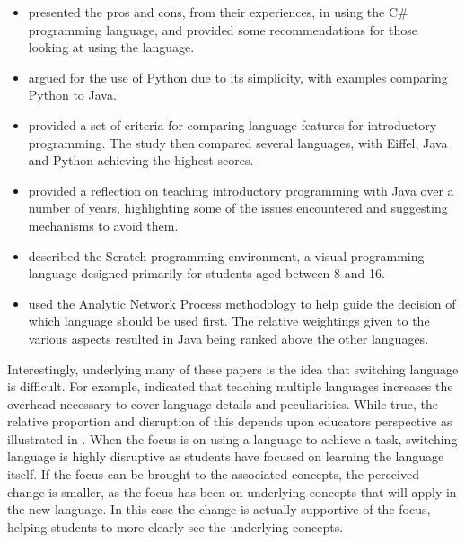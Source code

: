 \begin{itemize}[noitemsep,nolistsep]
	\item \citet{Bishop:2006} presented the pros and cons, from their experiences, in using the C\# programming language, and provided some recommendations for those looking at using the language.

	\item \citet{Mannila:2006} argued for the use of Python due to its simplicity, with examples comparing Python to Java.

	\item \citet{Mannila:2006a} provided a set of criteria for comparing language features for introductory programming. The study then compared several languages, with Eiffel, Java and Python achieving the highest scores.

	\item \citet{Pendergast:2006} provided a reflection on teaching introductory programming with Java over a number of years, highlighting some of the issues encountered and suggesting mechanisms to avoid them.

	\item \citet{Maloney:2010} described the Scratch programming environment, a visual programming language designed primarily for students aged between 8 and 16.

	\item \citet{Anik:2011} used the Analytic Network Process methodology to help guide the decision of which language should be used first. The relative weightings given to the various aspects resulted in Java being ranked above the other languages.
\end{itemize}

Interestingly, underlying many of these papers is the idea that switching language is difficult. For example, \citet{Brilliant:1996} indicated that teaching multiple languages increases the overhead necessary to cover language details and peculiarities. While true, the relative proportion and disruption of this depends upon educators perspective as illustrated in . When the focus is on using a language to achieve a task, switching language is highly disruptive as students have focused on learning the language itself. If the focus can be brought to the associated concepts, the perceived change is smaller, as the focus has been on underlying concepts that will apply in the new language. In this case the change is actually supportive of the focus, helping students to more clearly see the underlying concepts.

